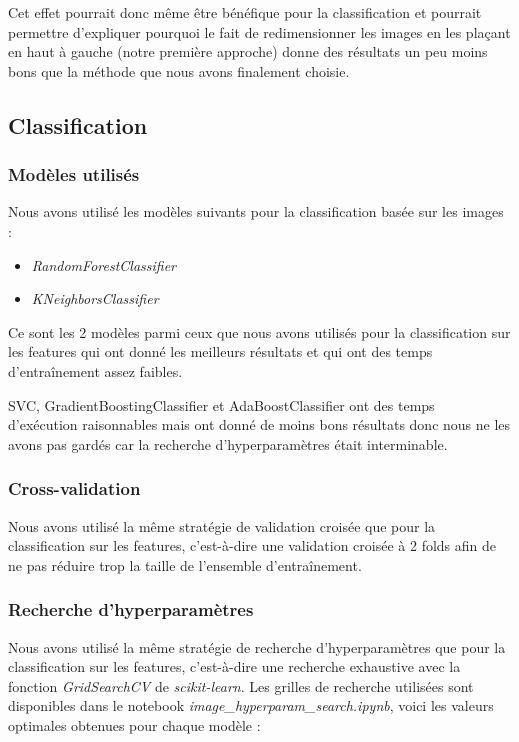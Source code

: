 \documentclass{article}
\begin{document}
Cet effet pourrait donc même être bénéfique pour la classification et pourrait permettre
d'expliquer pourquoi le fait de redimensionner les images en les plaçant en haut à gauche
(notre première approche)
donne des résultats un peu moins bons que la méthode que nous avons finalement choisie.

\subsection{Classification}

\subsubsection{Modèles utilisés}

Nous avons utilisé les modèles suivants pour la classification basée sur les images :
\begin{itemize}
    \item \textit{RandomForestClassifier} \cite{RFC}
    \item \textit{KNeighborsClassifier} \cite{KNN}
\end{itemize}

Ce sont les 2 modèles parmi ceux que nous avons utilisés pour la classification sur les features
qui ont donné les meilleurs résultats et qui ont des temps d'entraînement assez faibles.

SVC, GradientBoostingClassifier et AdaBoostClassifier ont des temps \\
d'exécution raisonnables mais ont donné de moins bons résultats donc nous
ne les avons pas gardés car la recherche d'hyperparamètres était interminable.

\subsubsection{Cross-validation}
Nous avons utilisé la même stratégie de validation croisée que pour la classification
sur les features, c'est-à-dire une validation croisée à 2 folds afin de ne pas réduire
trop la taille de l'ensemble d'entraînement.

\subsubsection{Recherche d'hyperparamètres}

Nous avons utilisé la même stratégie de recherche d'hyperparamètres que pour la classification
sur les features, c'est-à-dire une recherche exhaustive avec la fonction \textit{GridSearchCV}
\cite{GSCV} de \textit{scikit-learn}. Les grilles de recherche utilisées sont disponibles
dans le notebook \textit{image\_hyperparam\_search.ipynb}, voici les valeurs optimales
obtenues pour chaque modèle :
\end{document}
